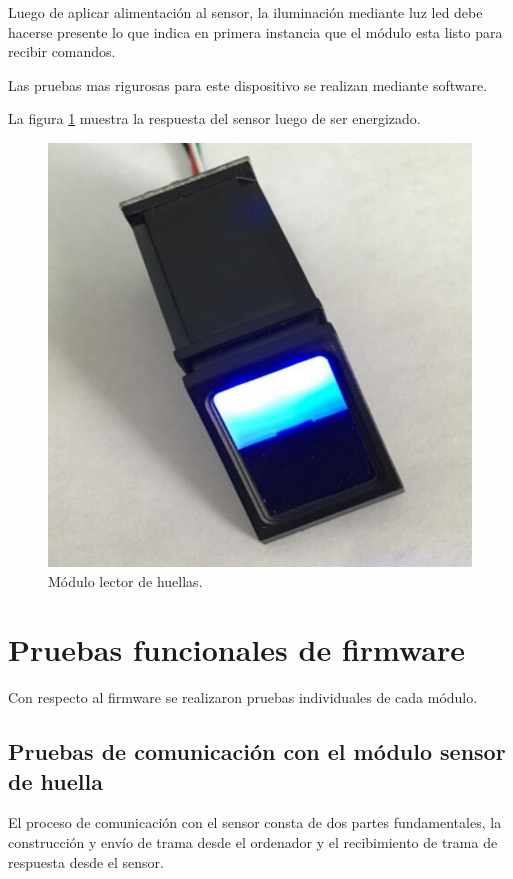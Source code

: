 Luego de aplicar alimentación al sensor, la iluminación mediante luz led debe hacerse presente lo que indica en primera instancia que el módulo esta listo para recibir comandos.

Las pruebas mas rigurosas para este dispositivo se realizan mediante software.

La figura \ref{fig:sensor} muestra la respuesta del sensor luego de ser energizado.

\begin{figure}[h]
	\centering
	\includegraphics[scale =.3]{./Figures/sensor.png}
	\caption{Módulo lector de huellas.}
	\label{fig:sensor}
\end{figure}

\section{Pruebas funcionales de firmware}
Con respecto al firmware se realizaron pruebas individuales de cada módulo.

\subsection{Pruebas de comunicación con el módulo sensor de huella}
El proceso de comunicación con el sensor consta de dos partes fundamentales, la construcción y envío de trama desde el ordenador y el recibimiento de trama de respuesta desde el sensor.


